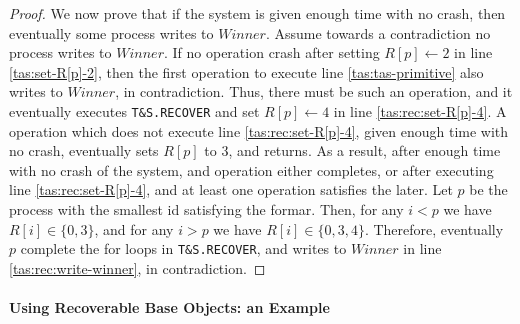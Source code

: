 \begin{proof}
	We now prove that if the system is given enough time with no crash, then eventually some process writes to $Winner$. Assume towards a contradiction no process writes to $Winner$. If no operation crash after setting $R[p] \gets 2$ in line \ref{tas:set-R[p]-2}, then the first operation to execute line \ref{tas:tas-primitive} also writes to $Winner$, in contradiction. Thus, there must be such an operation, and it eventually executes \texttt{T\&S.RECOVER} and set $R[p] \gets 4$ in line \ref{tas:rec:set-R[p]-4}. A operation which does not execute line \ref{tas:rec:set-R[p]-4}, given enough time with no crash, eventually sets $R[p]$ to 3, and returns. As a result, after enough time with no crash of the system, and operation either completes, or after executing line \ref{tas:rec:set-R[p]-4}, and at least one operation satisfies the later. Let $p$ be the process with the smallest id satisfying the formar. Then, for any $i < p$ we have $R[i] \in \{0,3\}$, and for any $i > p$ we have $R[i] \in \{0,3,4\}$. Therefore, eventually $p$ complete the for loops in \texttt{T\&S.RECOVER}, and writes to $Winner$ in line \ref{tas:rec:write-winner}, in contradiction.
	
\end{proof}




\paragraph*{Using Recoverable Base Objects: an Example}





